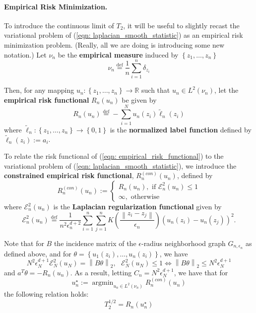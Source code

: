 \documentclass{article}
\newcommand{\Reals}{\mathbb{R}}
\newcommand{\norm}[1]{\left\lVert#1\right\rVert}
\newcommand{\defeq}{\overset{\mathrm{def}}{=}}
\newcommand{\set}[1]{\left\{#1\right\}}
\DeclareMathOperator*{\argmin}{argmin}
\newcommand{\1}{\mathbf{1}}
\theoremstyle{alden}
\theoremstyle{aldenthm}
\theoremstyle{remark}
\begin{document}
\paragraph{Empirical Risk Minimization.}
To introduce the continuous limit of $T_2$, it will be useful to slightly recast the variational problem of (\ref{eqn: laplacian_smooth_statistic}) as an empirical risk minimization problem. (Really, all we are doing is introducing some new notation.) Let $\nu_n$ be the \textbf{empirical measure} induced by $\set{z_1, \ldots, z_n}$
\begin{equation*}
\nu_n \defeq \frac{1}{n} \sum_{i = 1}^{n} \delta_{z_i}
\end{equation*}

Then, for any mapping $u_n: \set{z_1, \ldots, z_n} \to \Reals$ such that $u_n \in L^2(\nu_n)$, let the \textbf{empirical risk functional} $R_n(u_n)$ be given by
\begin{equation}
\label{eqn: empirical_risk_functional}
R_n(u_n) \defeq - \sum_{i = 1}^{N} u_n(z_i) \widetilde{\ell}_n(z_i)
\end{equation}
where $\widetilde{\ell}_n: \set{z_1, \ldots, z_n} \to \set{0,1}$ is the \textbf{normalized label function} defined by $\widetilde{\ell}_n(z_i) := a_i$. 

To relate the risk functional of (\ref{eqn: empirical_risk_functional}) to the variational problem of (\ref{eqn: laplacian_smooth_statistic}), we introduce the \textbf{constrained empirical risk functional}, $R_n^{(con)}(u_n)$, defined by
\begin{equation*}
R_n^{(con)}(u_n) := 
\begin{cases}
R_n(u_n), \text{ if $\mathcal{E}_n^2(u_n) \leq 1$} \\
\infty, \text{ otherwise }
\end{cases}
\end{equation*}
where $\mathcal{E}_n^2(u_n)$ is the \textbf{Laplacian regularization functional} given by
\begin{equation*}
\mathcal{E}_n^2(u_n) \defeq \frac{1}{n^2 \epsilon_n^{d+2}} \sum_{i = 1}^{n} \sum_{j = 1}^{n} K\left(\frac{\norm{z_i - z_j}}{\epsilon_n}\right)(u_n(z_i) - u_n(z_j))^2.
\end{equation*}

Note that for $B$ the incidence matrix of the $\epsilon$-radius neighborhood graph $G_{n,\epsilon_n}$ as defined above, and for $\theta = \set{u_1(z_i), \ldots, u_n(z_i)}$, we have
\begin{equation*}
N^2 \epsilon_N^{d+1} \mathcal{E}_N^2(u_N) = \norm{B \theta}_2, ~~~ \mathcal{E}_N^2(u_N) \leq 1 \Leftrightarrow \norm{B \theta}_2 \leq N^2 \epsilon_N^{d+1}
\end{equation*}
and $a^T \theta = - R_n(u_n)$.
As a result, letting $C_n = N^2 \epsilon_N^{d+1}$, we have that for
\begin{equation}
\label{eqn: minimizer_of_constrained_empirical_risk_functional}
u_n^{\star} := \argmin_{u_n \in L^2(\nu_n)} R_n^{(con)}(u_n)
\end{equation}
the following relation holds:
\begin{equation*}
T_2^{1/2} = R_n(u_n^{\star})
\end{equation*}
\end{document}
